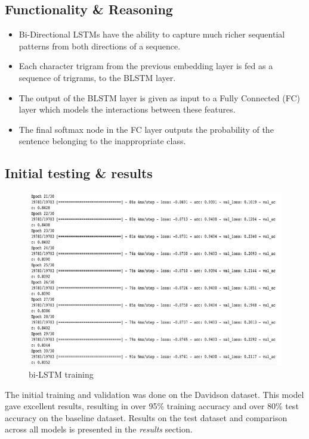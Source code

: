 \documentclass{article}[A4]
\begin{document}
\subsection{Functionality \& Reasoning}

\begin{itemize}
	\item{Bi-Directional LSTMs have the ability to capture much richer sequential patterns from both directions of a sequence.}
	\item{Each character trigram from the previous embedding layer is fed as a sequence of trigrams, to the BLSTM layer.}
	\item{The output of the BLSTM layer is given as input to a Fully Connected (FC) layer which models the interactions between these features.}
	\item{The final softmax node in the FC layer outputs the probability of the sentence belonging to the inappropriate class.}
\end{itemize}

\subsection{Initial testing \& results}

\begin{figure}[!htb]
    \centering
    \includegraphics[scale=0.50]{model_results.png}
    \caption{bi-LSTM training}
    \label{fig:model_res}
\end{figure}

The initial training and validation was done on the Davidson dataset. This model gave excellent results, resulting in over 95\% training accuracy and over 80\% test accuracy on the baseline dataset. Results on the test dataset and comparison across all models is presented in the \textit{results} section.
\end{document}
